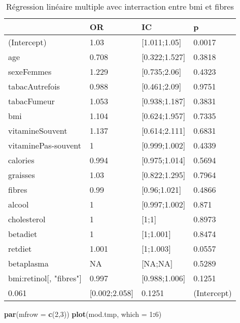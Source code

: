 \documentclass[]{article}
\newenvironment{Shaded}{\begin{snugshade}}{\end{snugshade}}
\newcommand{\KeywordTok}[1]{\textcolor[rgb]{0.13,0.29,0.53}{\textbf{#1}}}
\newcommand{\DataTypeTok}[1]{\textcolor[rgb]{0.13,0.29,0.53}{#1}}
\newcommand{\DecValTok}[1]{\textcolor[rgb]{0.00,0.00,0.81}{#1}}
\newcommand{\OperatorTok}[1]{\textcolor[rgb]{0.81,0.36,0.00}{\textbf{#1}}}
\newcommand{\NormalTok}[1]{#1}
\begin{document}
\begin{table}

\caption{\label{tab:unnamed-chunk-86}Régression linéaire multiple avec interraction entre bmi et fibres}
\centering
\begin{tabular}[t]{l|l|l|l}
\hline
  & OR & IC & p\\
\hline
\rowcolor[HTML]{BBD2E1}  (Intercept) & 1.03 & [1.011;1.05] & 0.0017\\
\hline
age & 0.708 & [0.322;1.527] & 0.3818\\
\hline
\rowcolor[HTML]{BBD2E1}  sexeFemmes & 1.229 & [0.735;2.06] & 0.4323\\
\hline
tabacAutrefois & 0.988 & [0.461;2.09] & 0.9751\\
\hline
\rowcolor[HTML]{BBD2E1}  tabacFumeur & 1.053 & [0.938;1.187] & 0.3831\\
\hline
bmi & 1.104 & [0.624;1.957] & 0.7335\\
\hline
\rowcolor[HTML]{BBD2E1}  vitamineSouvent & 1.137 & [0.614;2.111] & 0.6831\\
\hline
vitaminePas-souvent & 1 & [0.999;1.002] & 0.4339\\
\hline
\rowcolor[HTML]{BBD2E1}  calories & 0.994 & [0.975;1.014] & 0.5694\\
\hline
graisses & 1.03 & [0.822;1.295] & 0.7964\\
\hline
\rowcolor[HTML]{BBD2E1}  fibres & 0.99 & [0.96;1.021] & 0.4866\\
\hline
alcool & 1 & [0.997;1.002] & 0.871\\
\hline
\rowcolor[HTML]{BBD2E1}  cholesterol & 1 & [1;1] & 0.8973\\
\hline
betadiet & 1 & [1;1.001] & 0.8474\\
\hline
\rowcolor[HTML]{BBD2E1}  retdiet & 1.001 & [1;1.003] & 0.0557\\
\hline
betaplasma & NA & [NA;NA] & 0.5289\\
\hline
\rowcolor[HTML]{BBD2E1}  bmi:retinol[, "fibres"] & 0.997 & [0.988;1.006] & 0.1251\\
\hline
0.061 & [0.002;2.058] & 0.1251 & (Intercept)\\
\hline
\end{tabular}
\end{table}

\begin{Shaded}
\begin{Highlighting}[]
\KeywordTok{par}\NormalTok{(}\DataTypeTok{mfrow =} \KeywordTok{c}\NormalTok{(}\DecValTok{2}\NormalTok{,}\DecValTok{3}\NormalTok{))}
\KeywordTok{plot}\NormalTok{(mod.tmp, }\DataTypeTok{which =} \DecValTok{1}\OperatorTok{:}\DecValTok{6}\NormalTok{)}
\end{Highlighting}
\end{Shaded}
\end{document}
